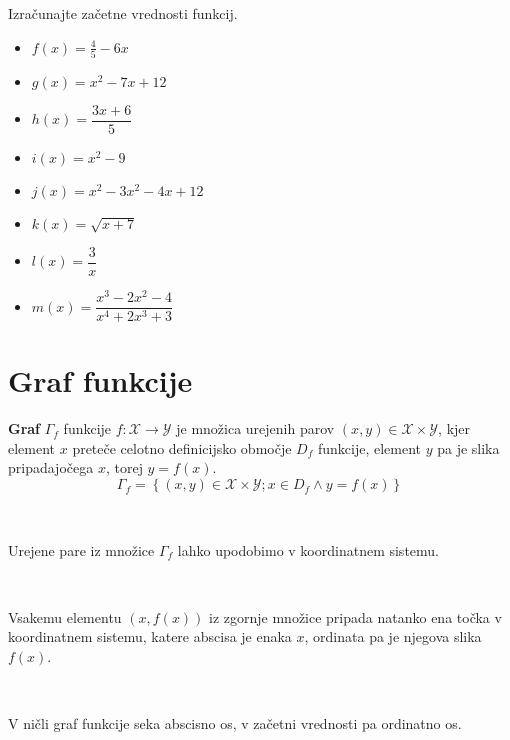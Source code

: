     \begin{naloga}
        Izračunajte začetne vrednosti funkcij.
        \begin{multicols}{2}
            \begin{itemize}
                \item $f(x)=\frac{4}{5}-6x$ 
                \item $g(x)=x^2-7x+12$ 
                \item $h(x)=\dfrac{3x+6}{5}$ 
                \item $i(x)=x^2-9$ 
                \item $j(x)=x^2-3x^2-4x+12$ 
                \item $k(x)=\sqrt{x+7}$ 
                \item $l(x)=\dfrac{3}{x}$ 
                \item $m(x)=\dfrac{x^3-2x^2-4}{x^4+2x^3+3}$ 
            \end{itemize}
        \end{multicols}
    \end{naloga}

\newpage


        \section{Graf funkcije}

            \textbf{Graf} $\Gamma_f$ funkcije $f:\mathcal{X}\to\mathcal{Y}$ je množica urejenih parov $(x,y)\in\mathcal{X}\times\mathcal{Y}$, 
                kjer element $x$ preteče celotno definicijsko območje $D_f$ funkcije, element $y$ pa je slika pripadajočega $x$, torej $y=f(x)$.
            $$ \Gamma_f=\left\{(x,y)\in\mathcal{X}\times\mathcal{Y}; x\in D_f \land y=f(x)\right\} $$
        
~

                Urejene pare iz množice $\Gamma_f$ lahko upodobimo v koordinatnem sistemu. 
               
               ~

                Vsakemu elementu $(x,f(x))$ iz zgornje množice pripada natanko ena točka v koordinatnem sistemu, 
                katere abscisa je enaka $x$, ordinata pa je njegova slika $f(x)$.

                ~

                V ničli graf funkcije seka abscisno os, v začetni vrednosti pa ordinatno os.



